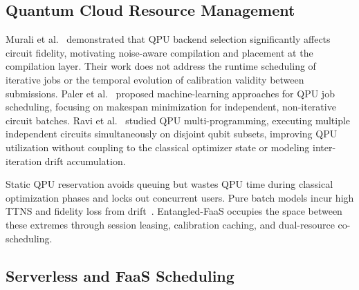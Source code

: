 \documentclass[conference]{IEEEtran}
\begin{document}
\subsection{Quantum Cloud Resource Management}
\label{subsec:related_cloud}

Murali et al.~\cite{murali2019noise} demonstrated that QPU backend
selection significantly affects circuit fidelity, motivating
noise-aware compilation and placement at the compilation layer. Their
work does not address the runtime scheduling of iterative jobs or the
temporal evolution of calibration validity between submissions. Paler et
al.~\cite{paler2021machine} proposed machine-learning approaches for
QPU job scheduling, focusing on makespan minimization for independent,
non-iterative circuit batches. Ravi et al.~\cite{ravi2021quantum}
studied QPU multi-programming, executing multiple independent circuits
simultaneously on disjoint qubit subsets, improving QPU utilization
without coupling to the classical optimizer state or modeling inter-iteration
drift accumulation.

Static QPU reservation avoids queuing but wastes QPU
time during classical optimization phases and locks out concurrent
users. Pure batch models incur high TTNS and fidelity loss from
drift~\cite{drift_qce_2020}. Entangled-FaaS occupies the space between
these extremes through session leasing, calibration caching, and
dual-resource co-scheduling.

\subsection{Serverless and FaaS Scheduling}
\label{subsec:related_faas}
\end{document}
